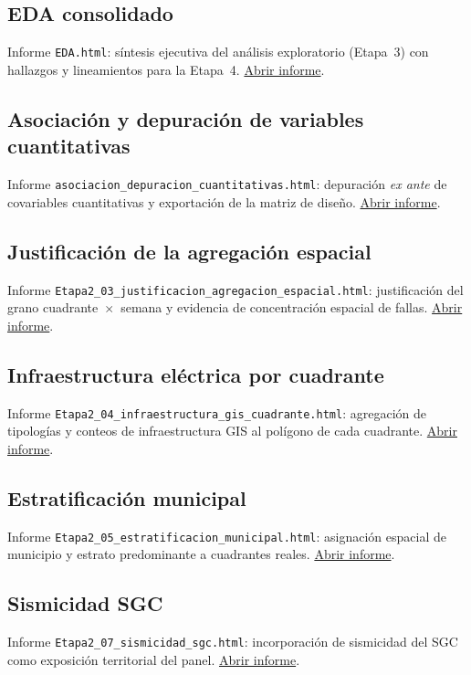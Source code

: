 \subsection{EDA consolidado}
\label{app:html-eda}
Informe \texttt{EDA.html}: síntesis ejecutiva del análisis exploratorio (Etapa~3) con hallazgos y lineamientos para la Etapa~4.
\href{\urlEDA}{Abrir informe}.

\subsection{Asociación y depuración de variables cuantitativas}
\label{app:html-asociacion-cuanti}
Informe \texttt{asociacion\_depuracion\_cuantitativas.html}: depuración \emph{ex ante} de covariables cuantitativas y exportación de la matriz de diseño.
\href{\urlasociaciondepuracioncuanti}{Abrir informe}.

\subsection{Justificación de la agregación espacial}
\label{app:html-etapa2-03}
Informe \texttt{Etapa2\_03\_justificacion\_agregacion\_espacial.html}: justificación del grano cuadrante~$\times$~semana y evidencia de concentración espacial de fallas.
\href{\urlEtapaDosTres}{Abrir informe}.

\subsection{Infraestructura eléctrica por cuadrante}
\label{app:html-etapa2-04}
Informe \texttt{Etapa2\_04\_infraestructura\_gis\_cuadrante.html}: agregación de tipologías y conteos de infraestructura GIS al polígono de cada cuadrante.
\href{\urlEtapaDosCuatro}{Abrir informe}.

\subsection{Estratificación municipal}
\label{app:html-etapa2-05}
Informe \texttt{Etapa2\_05\_estratificacion\_municipal.html}: asignación espacial de municipio y estrato predominante a cuadrantes reales.
\href{\urlEtapaDosCinco}{Abrir informe}.

\subsection{Sismicidad SGC}
\label{app:html-etapa2-07}
Informe \texttt{Etapa2\_07\_sismicidad\_sgc.html}: incorporación de sismicidad del SGC como exposición territorial del panel.
\href{\urlEtapaDosSiete}{Abrir informe}.


